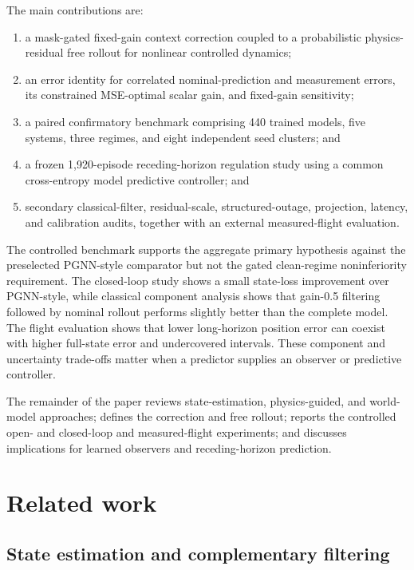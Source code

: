\documentclass[pdflatex,sn-basic]{sn-jnl}
\newcommand{\ConfirmatoryRuns}{440}
\begin{document}
The main contributions are:
\begin{enumerate}
 \item a mask-gated fixed-gain context correction coupled to a probabilistic
 physics-residual free rollout for nonlinear controlled dynamics;
 \item an error identity for correlated nominal-prediction and measurement
 errors, its constrained MSE-optimal scalar gain, and fixed-gain sensitivity;
 \item a paired confirmatory benchmark comprising \ConfirmatoryRuns{} trained
 models, five systems, three regimes, and eight independent seed clusters; and
 \item a frozen 1,920-episode receding-horizon regulation study using a
 common cross-entropy model predictive controller; and
 \item secondary classical-filter, residual-scale, structured-outage,
 projection, latency, and calibration audits, together with an external
 measured-flight evaluation.
\end{enumerate}

The controlled benchmark supports the aggregate primary hypothesis against the
preselected PGNN-style comparator but not the gated clean-regime noninferiority
requirement. The closed-loop study shows a small state-loss improvement over
PGNN-style, while classical component analysis shows that gain-0.5 filtering
followed by nominal rollout performs slightly better than the complete model.
The flight evaluation shows that lower long-horizon position error can coexist
with higher full-state error and undercovered intervals. These component and uncertainty
trade-offs matter when a predictor supplies an observer or predictive
controller.

The remainder of the paper reviews state-estimation, physics-guided, and world-
model approaches; defines the correction and free rollout; reports the
controlled open- and closed-loop and measured-flight experiments; and discusses implications for learned
observers and receding-horizon prediction.

\section{Related work}

\subsection{State estimation and complementary filtering}
\end{document}
